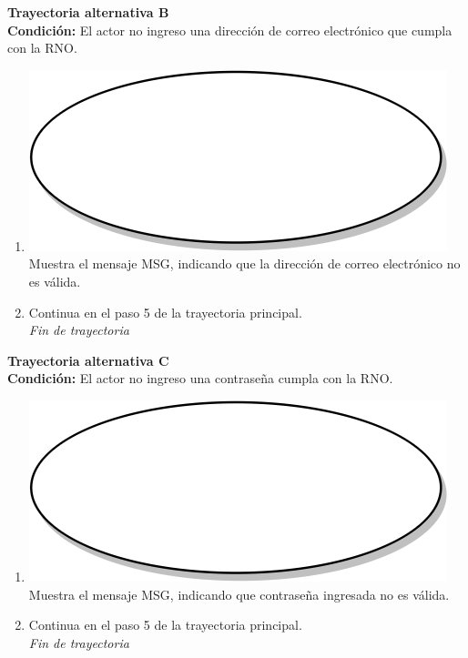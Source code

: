 \textbf{Trayectoria alternativa B} \label{cu2_ta_b}\\
\textbf{Condición:} El actor no ingreso una dirección de correo electrónico que cumpla con la RNO.\\
 \begin{enumerate}[label=B\arabic*]
    \item {\includegraphics[scale=.05]{Capitulo3/img/proceso.png} Muestra el mensaje MSG, indicando que la dirección de correo electrónico no es válida.}
    \item {Continua en el paso 5 de la trayectoria principal.} \\
    \textit{Fin de trayectoria} \\
\end{enumerate}

\textbf{Trayectoria alternativa C} \label{cu2_ta_c}\\
\textbf{Condición:} El actor no ingreso una contraseña cumpla con la RNO.\\
 \begin{enumerate}[label=C\arabic*]
    \item {\includegraphics[scale=.05]{Capitulo3/img/proceso.png} Muestra el mensaje MSG, indicando que contraseña ingresada no es válida.}
    \item {Continua en el paso 5 de la trayectoria principal.} \\
    \textit{Fin de trayectoria} \\
\end{enumerate}

